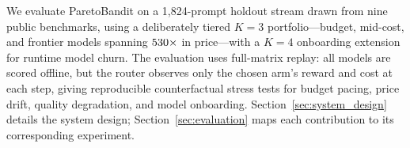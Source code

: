 We evaluate ParetoBandit on a 1,824-prompt holdout stream drawn from nine public benchmarks, using a deliberately tiered $K{=}3$ portfolio---budget, mid-cost, and frontier models spanning $530{\times}$ in price---with a $K{=}4$ onboarding extension for runtime model churn. The evaluation uses full-matrix replay: all models are scored offline, but the router observes only the chosen arm's reward and cost at each step, giving reproducible counterfactual stress tests for budget pacing, price drift, quality degradation, and model onboarding. Section~\ref{sec:system_design} details the system design; Section~\ref{sec:evaluation} maps each contribution to its corresponding experiment.
